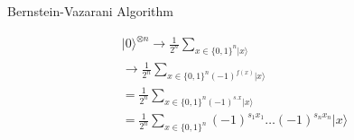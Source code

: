     \begin{frame}{Bernstein-Vazarani Algorithm}
        \begin{center}
        \begin{gather}
            |0\rangle^{\otimes n} \rightarrow \frac{1}{2^n} \sum_{x\in\{0,1\}^n |x\rangle}\\
            \rightarrow \frac{1}{2^n} \sum_{x\in\{0,1\}^n (-1)^{f(x)} |x\rangle}\\
            = \frac{1}{2^n} \sum_{x\in\{0,1\}^n (-1)^{s.x} |x\rangle} \\
            = \frac{1}{2^n} \sum_{x\in\{0,1\}^n} (-1)^{s_1x_1} \dots (-1)^{s_nx_n}  |x\rangle
        \end{gather}
    \end{center}
    \end{frame}
    




